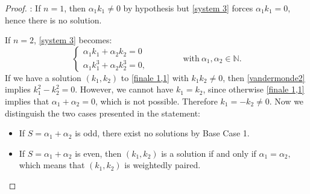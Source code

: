 \documentclass[10pt,a4paper]{amsart}
\def \N{\mathbb N}
\begin{document}
\begin{proof}
\smallskip

: If $n=1$, then $\alpha_1 k_1 \neq 0$ by hypothesis but \eqref{system 3} forces $\alpha_1 k_1 = 0$, hence there is no solution.

\smallskip

 If $n=2$, \eqref{system 3}  becomes:
\begin{equation}
\begin{cases}
\alpha_1 k_1 + \alpha_2 k_2 = 0 \\
\alpha_1 k_1^3 + \alpha_2 k_2^3 = 0, 
\end{cases} \qquad \qquad \mbox{with}\ \alpha_1,\alpha_2 \in \N.
\label{finale 1,1}
\end{equation}
If we have a solution $(k_1,k_2)$ to \eqref{finale 1,1} with $k_1k_2 \neq 0$, then \eqref{vandermonde2} implies $k_1^2-k_2^2=0$. However, we cannot have $k_1=k_2$, since otherwise \eqref{finale 1,1} implies that $\alpha_1 + \alpha_2 = 0$, which is not possible. Therefore $k_1=-k_2 \neq 0$. Now we distinguish the two cases presented in the statement:
\begin{itemize}
    \item If $S=\alpha_1+\alpha_2$ is odd, there exist no solutions by Base Case 1. 
    \item If $S=\alpha_1+\alpha_2$ is even, then $(k_1,k_2)$ is a solution if and only if $\alpha_1=\alpha_2,$ which means that $(k_1,k_2)$ is weightedly paired.
\end{itemize}


\end{proof}
\end{document}
